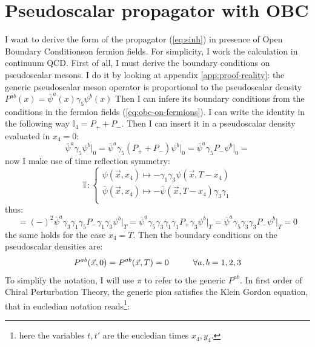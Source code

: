 \documentclass[english, LaM, oneside, noexaminfo]{sapthesis}
\newcommand{\obc}{Open Boundary Conditions}
\begin{document}
\section{Pseudoscalar propagator with OBC}\label{app:sinh-proof}
\noindent
I want to derive the form of the propagator (\ref{eq:sinh}) in presence of \obc\space on fermion fields.
For simplicity, I work the calculation in continuum QCD.
First of all, I must derive the boundary conditions on pseudoscalar mesons.
I do it by looking at appendix \ref{app:proof-reality}: the generic pseudoscalar meson operator is proportional to the pseudoscalar density $P^{ab}(x)=\bar \psi^a (x) \gamma_5 \psi^b (x)$
Then I can infere its boundary conditions from the conditions in the fermion fields (\ref{eq:obc-on-fermions}).
\newline
I can write the identity in the following way $\mathbb{I}_4 = P_+ + P_-$.
Then I can insert it in a pseudoscalar density evaluated in $x_4 = 0$:
\begin{equation*}
    \bar\psi^a \gamma_5 \psi^b \Big|_0 = \bar\psi^a \gamma_5 (P_+ + P_-) \psi^b \Big|_0 = \bar\psi^a \gamma_5 P_- \psi^b \Big|_0 =
\end{equation*}
now I make use of time reflection symmetry:
\begin{equation*}
    \mathbb{T}: 
    \begin{cases}
        \psi (\vec x, x_4) \mapsto - \gamma_1 \gamma_3 \psi (\vec x,T-x_4) \\
        \bar \psi (\vec x, x_4) \mapsto - \bar\psi (\vec x,T-x_4) \gamma_3 \gamma_1 \\
    \end{cases}
\end{equation*}
thus:
\begin{equation*}
    = (-)^2 \bar\psi^a \gamma_3 \gamma_1 \gamma_5 P_- \gamma_1 \gamma_3 \psi^b \Big|_T = \bar\psi^a \gamma_5 \gamma_3 \gamma_1 \gamma_1 P_+ \gamma_3 \psi^b \Big|_T = \bar\psi^a \gamma_5 \gamma_3 \gamma_3 P_- \psi^b \Big|_T = 0
\end{equation*}
the same holds for the case $x_4 = T$. Then the boundary conditions on the pseudoscalar densities are:
\begin{equation}\label{obc-on-pions}
    P^{ab} (\vec x , 0) = P^{ab} (\vec x , T) = 0 \hspace*{1cm} \forall a,b = 1,2,3
\end{equation}
To simplify the notation, I will use $\pi$ to refer to the generic $P^{ab}$.
\newline
In first order of Chiral Perturbation Theory, the generic pion satisfies the Klein Gordon equation, that in eucledian notation reads\footnote{here the variables $t,t'$ are the eucledian times $x_4, y_4$.}:
\end{document}
